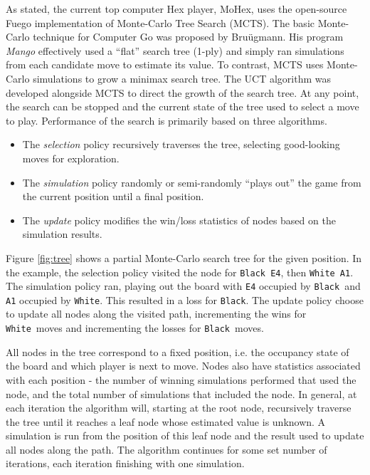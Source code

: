 \documentclass[11pt]{report}
\newcommand{\black}{\texttt{Black}}
\newcommand{\white}{\texttt{White}}
\begin{document}
As stated, the current top computer Hex player, MoHex, uses the open-source Fuego implementation of Monte-Carlo Tree Search (MCTS)\cite{mohex}. The basic Monte-Carlo technique for Computer Go was proposed by Bru\"{u}gmann\cite{brugmann1993monte}. His program \emph{Mango} effectively used a ``flat'' search tree (1-ply) and simply ran simulations from each candidate move to estimate its value. To contrast, MCTS uses Monte-Carlo simulations to grow a minimax search tree. The UCT algorithm was developed alongside MCTS to direct the growth of the search tree\cite{gelly2006exploration}. At any point, the search can be stopped and the current state of the tree used to select a move to play. Performance of the search is primarily based on three algorithms.
\begin{itemize}
\item{The \emph{selection} policy recursively traverses the tree, selecting good-looking moves for exploration.}
\item{The \emph{simulation} policy randomly or semi-randomly ``plays out'' the game from the current position until a final position.}
\item{The \emph{update} policy modifies the win/loss statistics of nodes based on the simulation results.}
\end{itemize}
Figure \ref{fig:tree} shows a partial Monte-Carlo search tree for the given position. In the example, the selection policy visited the node for \texttt{Black E4}, then \texttt{White A1}. The simulation policy ran, playing out the board with \texttt{E4} occupied by \black\ and \texttt{A1} occupied by \white. This resulted in a loss for \black. The update policy choose to update all nodes along the visited path, incrementing the wins for \white\ moves and incrementing the losses for \black\ moves.

All nodes in the tree correspond to a fixed position, i.e. the occupancy state of the board and which player is next to move. Nodes also have statistics associated with each position - the number of winning simulations performed that used the node, and the total number of simulations that included the node. In general, at each iteration the algorithm will, starting at the root node, recursively traverse the tree until it reaches a leaf node whose estimated value is unknown. A simulation is run from the position of this leaf node and the result used to update all nodes along the path. The algorithm continues for some set number of iterations, each iteration finishing with one simulation.
\end{document}
